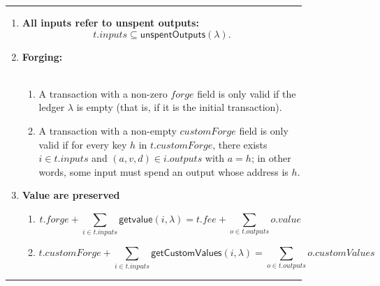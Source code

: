 \documentclass[a4paper]{article}
\newcommand{\s}{\textsf}  %
\theoremstyle{definition}  %
\newcommand\rfskip{7pt}
\newenvironment{ruledfigure}[1]{\begin{figure}[#1]\hrule\vspace{\rfskip}}{\vspace{\rfskip}\hrule\end{figure}}
\newcommand{\mi}[1]{\ensuremath{\mathit{#1}}}
\newcommand{\inputs}{\mi{inputs}}
\newcommand{\outputs}{\mi{outputs}}
\newcommand{\forge}{\mi{forge}}
\newcommand{\fee}{\mi{fee}}
\newcommand{\val}{\mi{value}}  %
\newcommand{\customvals}{\mi{customValues}}
\newcommand{\customforge}{\mi{customForge}}
\newcommand{\getvalue}{\msf{getvalue}}
\newcommand{\msf}[1]{\ensuremath{\mathsf{#1}}}
\newcommand{\unspent}{\msf{unspentOutputs}}
\begin{document}
\begin{ruledfigure}{H}
  \begin{enumerate}
    \item \label{rule:all-inputs-refer-to-unspent-outputs-2} \textbf{All
      inputs refer to unspent outputs:}
      \[
        t.\inputs \subseteq \unspent(\lambda).
      \]
    \item\textbf{Forging:}\\\\
      \begin{minipage}{0.85\textwidth}
          \begin{enumerate}
          \item
              A transaction with a non-zero \forge{} field is only
            valid if the ledger $\lambda$ is empty
            (that is, if it is the initial
            transaction). 
          \item \label{rule:custom-forge}
            A transaction with a non-empty \customforge{} field is
            only valid if for every key $h$ in $t.\customforge$, there
            exists $i \in t.\inputs$ and $(a,v,d) \in i.\outputs$ with
            $a =h$; in other words, some input must spend an output
            whose address is $h$.
          \end{enumerate}
          \end{minipage}
    \item \textbf{Value are preserved}\\
      \begin{minipage}{0.85\textwidth}
          \begin{enumerate}
          \item\label{rule:native-value-is-preserved-2}
            \[
            t.\forge + \sum_{i \in t.\inputs} \getvalue(i, \lambda) = t.\fee + \sum_{o \in t.\outputs} o.\val
            \]

          \item\label{rule:custom-values-are-preserved-2}
            \[
            t.\customforge + \sum_{i \in t.\inputs} \s{getCustomValues}(i, \lambda) = \sum_{o \in t.\outputs} o.\customvals
            \]
          \end{enumerate}
          

\end{minipage}
\end{enumerate}
\end{ruledfigure}
\end{document}
